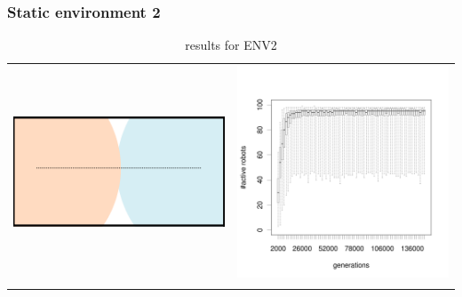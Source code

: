 \documentclass[a4paper,10pt]{article}
\begin{document}
\subsubsection{Static environment 2}
\begin{table}[H]
\caption{results for ENV2}
\centering
\begin{tabular}{cc}
\includegraphics[width=\imgSize]{../images/5StaticEnv/environments/staticEnv2}&\includegraphics[width=\imgSize]{../images/5StaticEnv/alive_staticEnv2}\\
\newline

\end{tabular}
\end{table}
\end{document}
